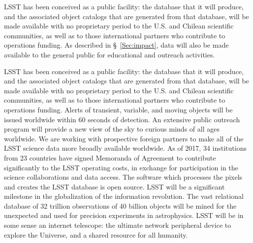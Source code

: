 

LSST has been conceived as a public facility: the database that it will
produce, and the associated object catalogs that are generated from that
database, will be made available with no proprietary period to the
U.S. and Chilean scientific communities, as well as to those
international partners who contribute to operations funding.  As
described in \S~\ref{Sec:impact}, data will also be made available to
the general public for educational and outreach activities.

LSST has been conceived as a public facility: the database that it will
produce, and the associated object catalogs that are generated from that
database, will be made available with no proprietary period to the U.S. and Chilean
scientific communities, as well as to those international partners who contribute 
to operations funding.  
Alerts of transient, variable, and moving objects will be issued worldwide within
60 seconds of detection.
An extensive public outreach program will provide a new view of the sky to
curious minds of all ages worldwide.
We are working with prospective foreign partners to make all of the LSST science data 
more broadly available worldwide.  As of 2017, 34 institutions from 23 countries
have signed Memoranda of Agreement to contribute significantly to
the LSST operating costs, in exchange for participation in the science collaborations
and data access.  The software which processes the pixels
and creates the LSST database is open source.
LSST will be a significant milestone in the globalization of the information revolution.
The vast relational database of 32 trillion observations of 40 billion objects
will be mined for the unexpected and used for precision experiments in astrophysics.
LSST will be in some sense an internet telescope:
the ultimate network peripheral device to explore the Universe, and
a shared resource for all humanity.
